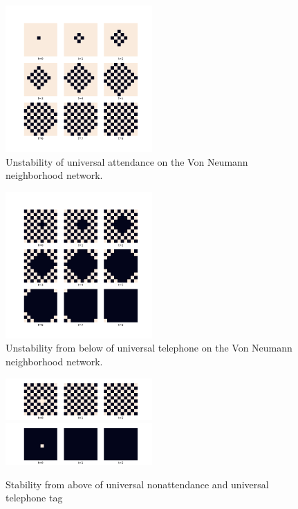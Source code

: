 \documentclass[12pt]{article}
\begin{document}
\begin{figure}[h!]
\includegraphics[width=0.5\textwidth]{one_minus.png}
\caption{Unstability of universal attendance on the Von Neumann neighborhood network.}
\end{figure}
\begin{figure}[h!]
\includegraphics[width=0.5\textwidth]{alt_minus.png}
\caption{Unstability from below of universal telephone on the Von Neumann neighborhood network.}
\end{figure}

\begin{figure}
\includegraphics[width=0.5\textwidth]{alt_plus.png}
\includegraphics[width=0.5\textwidth]{zero_plus.png}
\caption{Stability from above of universal nonattendance and universal telephone tag}
\end{figure}
\end{document}
